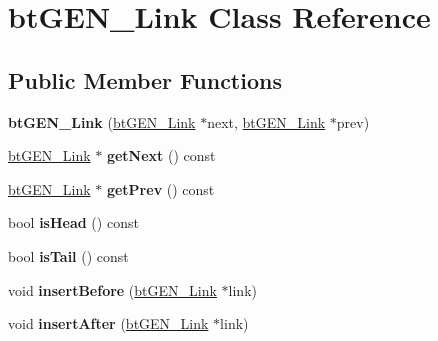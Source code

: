 \hypertarget{classbtGEN__Link}{}\section{bt\+G\+E\+N\+\_\+\+Link Class Reference}
\label{classbtGEN__Link}
\subsection*{Public Member Functions}
\begin{DoxyCompactItemize}
\item 
\mbox{\label{classbtGEN__Link_afaba3db8d7d56d142b31d55cc5a10bc4}} 
{\bfseries bt\+G\+E\+N\+\_\+\+Link} (\hyperlink{classbtGEN__Link}{bt\+G\+E\+N\+\_\+\+Link} $\ast$next, \hyperlink{classbtGEN__Link}{bt\+G\+E\+N\+\_\+\+Link} $\ast$prev)
\item 
\mbox{\label{classbtGEN__Link_a970ce1adca46812aa82447277293758b}} 
\hyperlink{classbtGEN__Link}{bt\+G\+E\+N\+\_\+\+Link} $\ast$ {\bfseries get\+Next} () const
\item 
\mbox{\label{classbtGEN__Link_a59e43cf9051cfb5a382080cbc91e0a0f}} 
\hyperlink{classbtGEN__Link}{bt\+G\+E\+N\+\_\+\+Link} $\ast$ {\bfseries get\+Prev} () const
\item 
\mbox{\label{classbtGEN__Link_a2379f363e64d96fa9dfb0e2c81c17f47}} 
bool {\bfseries is\+Head} () const
\item 
\mbox{\label{classbtGEN__Link_a342b96a01677249c377eb74d4381c583}} 
bool {\bfseries is\+Tail} () const
\item 
\mbox{\label{classbtGEN__Link_af9a44671d7450b325ad0805b01eed382}} 
void {\bfseries insert\+Before} (\hyperlink{classbtGEN__Link}{bt\+G\+E\+N\+\_\+\+Link} $\ast$link)
\item 
\mbox{\label{classbtGEN__Link_a5cd8cbf3991ce5c33771ce3abcc54cd5}} 
void {\bfseries insert\+After} (\hyperlink{classbtGEN__Link}{bt\+G\+E\+N\+\_\+\+Link} $\ast$link)
\item 
\mbox{\label{classbtGEN__Link_ac2fcb105c73b7e9473d2cdca22d26c7b}} 

\end{DoxyCompactItemize}
